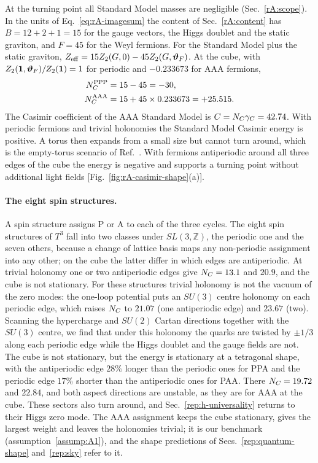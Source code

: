 At the turning point all Standard Model masses are negligible (Sec.~\ref{rA:scope}).
In the units of Eq.~\eqref{eq:rA-imagesum} the content of Sec.~\ref{rA:content} has $B=12+2+1=15$ for the gauge vectors, the Higgs doublet and the static graviton, and $F=45$ for the Weyl fermions. %
For the Standard Model plus the static graviton, $Z_{\rm eff}=15Z_2(G,0)-45Z_2(G,\bm\vartheta_F)$. %
At the cube, with $Z_2(\mathbf{1},\bm\vartheta_F)/Z_2(\mathbf{1})=1$ for periodic and $-0.233673$ for AAA fermions,
\begin{equation}
\begin{aligned}
\NC^{\rm PPP}&=15-45=-30,\\ %
\NC^{\rm AAA}&=15+45\times0.233673=+25.515 . %
\end{aligned}
\label{eq:rA-NCSM}
\end{equation}
The Casimir coefficient of the AAA Standard Model is $C=N_C\gamma_C=42.74$. %
With periodic fermions and trivial holonomies the Standard Model Casimir energy is positive.
A torus then expands from a small size but cannot turn around, which is the empty-torus scenario of Ref.~\cite{Fornal:2026qfq}.
With fermions antiperiodic around all three edges of the cube the energy is negative and supports a turning point without additional light fields [Fig.~\ref{fig:rA-casimir-shape}(a)].

\paragraph{The eight spin structures.}
A spin structure assigns P or A to each of the three cycles.
The eight spin structures of $T^3$ fall into two classes under $SL(3,\mathbb Z)$, the periodic one and the seven others, because a change of lattice basis maps any non-periodic assignment into any other; on the cube the latter differ in which edges are antiperiodic.
At trivial holonomy one or two antiperiodic edges give $N_C=13.1$ and $20.9$, and the cube is not stationary. %
For these structures trivial holonomy is not the vacuum of the zero modes: the one-loop potential puts an $SU(3)$ centre holonomy on each periodic edge, which raises $N_C$ to $21.07$ (one antiperiodic edge) and $23.67$ (two). %
Scanning the hypercharge and $SU(2)$ Cartan directions together with the $SU(3)$ centre, we find that under this holonomy the quarks are twisted by $\pm1/3$ along each periodic edge while the Higgs doublet and the gauge fields are not.
The cube is not stationary, but the energy is stationary at a tetragonal shape, with the antiperiodic edge $28\%$ longer than the periodic ones for PPA and the periodic edge $17\%$ shorter than the antiperiodic ones for PAA. %
There $N_C=19.72$ and $22.84$, and both aspect directions are unstable, as they are for AAA at the cube. %
These sectors also turn around, and Sec.~\ref{rep:h-universality} returns to their Higgs zero mode.
The AAA assignment keeps the cube stationary, gives the largest weight and leaves the holonomies trivial; it is our benchmark (assumption~\ref{assump:A1}), and the shape predictions of Secs.~\ref{rep:quantum-shape} and~\ref{rep:sky} refer to it.

